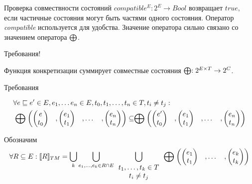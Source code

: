 Проверка совмествности состояний $compatible^E: 2^E \to Bool$ возвращает $true$, если частичные состояния могут быть частями одного состояния.
Оператор \emph{compatible} используется для удобства.
Значение оператора сильно связано со значением оператора $\mathrel{\bigoplus}$.

Требования!

Функция конкретизации суммирует совместные состояния
$\mathrel{\bigoplus}: 2^{E \times T} \to 2^C$.

Требования

\begin{equation}
\label{cpa_tm_abstract_domain_2}
\begin{aligned}
& \forall e \sqsubseteq e' \in E, e_1, \dots e_n \in E, t_0,t_1,\dots,t_n \in T, t_i \neq t_j : \\
& \mathrel{\bigoplus} 
\begin{pmatrix}
\begin{pmatrix}
e \\
t_0 
\end{pmatrix}& ,
\begin{pmatrix}
e_1 \\
t_1 
\end{pmatrix}&,
\dots& ,
\begin{pmatrix}
e_n \\
t_n 
\end{pmatrix}
\end{pmatrix} 
\subseteq \mathrel{\bigoplus}
\begin{pmatrix}
\begin{pmatrix}
e' \\
t_0 
\end{pmatrix}& ,
\begin{pmatrix}
e_1 \\
t_1 
\end{pmatrix}&,
\dots& ,
\begin{pmatrix}
e_n \\
t_n 
\end{pmatrix}
\end{pmatrix} 
\end{aligned}
\end{equation}

Обозначим
\begin{equation}
\begin{aligned}
\forall R\subseteq E: [\![ R ]\!]_{TM} = 
\bigcup_{k}
{\bigcup_{e_1,\dots,e_k \in R \cap E}{
\bigcup_{
\begin{array}{c}
t_1,\dots,t_k \in T \\
t_i \neq t_j
\end{array}
} {
\mathrel{\bigoplus}
\begin{pmatrix}
\begin{pmatrix}
e_1 \\
t_1 
\end{pmatrix}&,
\dots& ,
\begin{pmatrix}
e_k \\
t_k 
\end{pmatrix}
\end{pmatrix} 
}
}
}
\end{aligned}
\end{equation}

